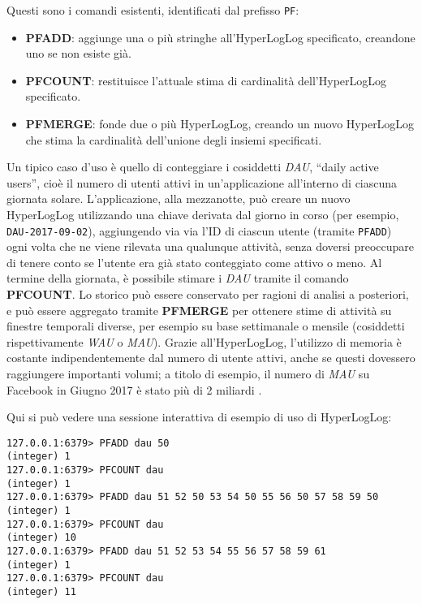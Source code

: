 Questi sono i comandi esistenti, identificati dal prefisso \verb|PF|:

\begin{itemize}
	\medskip
	\item \textbf{PFADD}: aggiunge una o più stringhe all'HyperLogLog specificato, creandone uno
	se non esiste già.
	\item \textbf{PFCOUNT}: restituisce l'attuale stima di cardinalità dell'HyperLogLog
	specificato.
	\item \textbf{PFMERGE}: fonde due o più HyperLogLog, creando un nuovo HyperLogLog che stima la
	cardinalità dell'unione degli insiemi specificati.
\end{itemize}

Un tipico caso d'uso è quello di conteggiare i cosiddetti \emph{DAU}, ``daily active users'', cioè
il numero di utenti attivi in un'applicazione all'interno di ciascuna giornata solare.
L'applicazione, alla mezzanotte, può creare un nuovo HyperLogLog utilizzando una chiave derivata dal
giorno in corso (per esempio, \verb|DAU-2017-09-02|), aggiungendo via via l'ID di ciascun utente
(tramite \verb|PFADD|) ogni volta che ne viene rilevata una qualunque attività, senza doversi
preoccupare di tenere conto se l'utente era già stato conteggiato come attivo o meno. Al termine
della giornata, è possibile stimare i \emph{DAU} tramite il comando \textbf{PFCOUNT}. Lo storico può
essere conservato per ragioni di analisi a posteriori, e può essere aggregato tramite
\textbf{PFMERGE} per ottenere stime di attività su finestre temporali diverse, per esempio su base
settimanale o mensile (cosiddetti rispettivamente \emph{WAU} o \emph{MAU}). Grazie all'HyperLogLog,
l'utilizzo di memoria è costante indipendentemente dal numero di utente attivi, anche se questi
dovessero raggiungere importanti volumi; a titolo di esempio, il numero di \emph{MAU} su Facebook in
Giugno 2017 è stato più di 2 miliardi \cite{fb-mau}.

Qui si può vedere una sessione interattiva di esempio di uso di HyperLogLog:

\medskip
\begin{lstlisting}
127.0.0.1:6379> PFADD dau 50
(integer) 1
127.0.0.1:6379> PFCOUNT dau
(integer) 1
127.0.0.1:6379> PFADD dau 51 52 50 53 54 50 55 56 50 57 58 59 50
(integer) 1
127.0.0.1:6379> PFCOUNT dau
(integer) 10
127.0.0.1:6379> PFADD dau 51 52 53 54 55 56 57 58 59 61
(integer) 1
127.0.0.1:6379> PFCOUNT dau
(integer) 11
\end{lstlisting}

